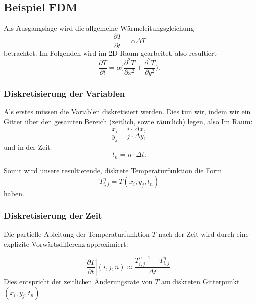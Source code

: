 \subsection{Beispiel FDM}

Als Ausgangslage wird die allgemeine Wärmeleitungsgleichung
\begin{equation}
	\frac{\partial T}{\partial t}
	=
	\alpha \Delta T
	\label{parallelisierung:eq:Wärmeleitung_alg}
\end{equation}
betrachtet.
Im Folgenden wird im 2D-Raum gearbeitet, also resultiert
\begin{equation}
	\frac{\partial T}{\partial t}
	=
	\alpha \biggl(
	\frac{\partial^2 T}{\partial x^2}
	+
	\frac{\partial^2 T}{\partial y^2}
	\biggr).
	\label{parallelisierung:eq:Wärmeleitung_2D}
\end{equation}


\subsubsection{Diskretisierung der Variablen}

Als erstes müssen die Variablen diskretisiert werden. Dies tun wir, indem wir ein Gitter über den gesamten Bereich (zeitlich, sowie räumlich) legen, also
Im Raum:
\begin{equation}
	x_i
	=
	i \cdot \Delta x,
\end{equation}
\begin{equation}
	y_j
	=
	j \cdot \Delta y,
\end{equation}
und in der Zeit:
\begin{equation}
	t_n
	=
	n \cdot \Delta t.
\end{equation}

Somit wird unsere resultierende, diskrete Temperaturfunktion die Form
\begin{equation}
	T^n_{i,j}
	=
	T(x_i,y_j,t_n)
\end{equation}
haben.


\subsubsection{Diskretisierung der Zeit}

Die partielle Ableitung der Temperaturfunktion \( T \) nach der Zeit wird durch eine explizite Vorwärtsdifferenz approximiert:

\begin{equation}
	\label{parallelisierung:eq:discrete_time_derivative}
	\left. \frac{\partial T}{\partial t}\right|{(i,j,n)}
	\approx
	\frac{T_{i,j}^{n+1} - T_{i,j}^n}{\Delta t}.
\end{equation}
Dies entspricht der zeitlichen Änderungsrate von \( T \) am diskreten Gitterpunkt \( (x_i, y_j, t_n) \).

